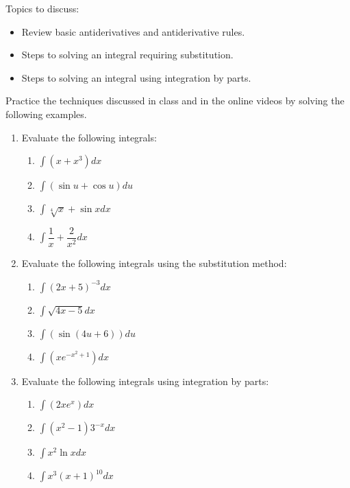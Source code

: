 \documentclass[10pt]{book}
\theoremstyle{definition}
\theoremstyle{remark}
\begin{document}
\begin{large}
\noindent
Topics to discuss:
\begin{itemize}
\item Review basic antiderivatives and antiderivative rules. 
\item Steps to solving an integral requiring substitution.
\item Steps to solving an integral using integration by parts. 
\end{itemize}
\newpage

\noindent
Practice the techniques discussed in class and in the online videos by solving the following examples. 
\begin{enumerate}
\item Evaluate the following integrals:
\begin{enumerate}
	\item $\displaystyle \int \left(x + x^3\right) dx$ \vfil
	\item $\displaystyle \int \left(\sin u + \cos u\right) du$ \vfil
	\item $\displaystyle \int \sqrt[4]{x}  + \sin x dx$ \vfil\vfil
	\item $\displaystyle \int \dfrac{1}{x} + \dfrac{2}{x^2} dx$ \vfil
\end{enumerate}
\newpage

\item    Evaluate the following integrals using the substitution method:
\begin{enumerate}
	\item    $\displaystyle \int \left(2x+5\right)^{-3} dx$ \vfil\vfil
	\item    $\displaystyle \int \sqrt{4x-5} dx$ \vfil\vfil
	\item    $\displaystyle \int \left(\sin(4u+6) \right) du$ \vfil\vfil
	\item    $\displaystyle \int \left( xe^{-x^2+1}\right) dx$ \vfil
\end{enumerate}
\newpage

\item Evaluate the following integrals using integration by parts:
\begin{enumerate}
	\item    $\displaystyle \int \left(2xe^{x}  \right) dx$ \vfil\vfil
	\item    $\displaystyle \int \left( x^2 - 1\right) 3^{-x} dx$ \vfil\vfil
	\item    $\displaystyle \int x^2 \ln x dx$ \vfil\vfil
	\item    $\displaystyle \int x^3(x+1)^{10} dx$ \vfil
\end{enumerate}   
\newpage


\end{enumerate}
\end{large}
\end{document}
